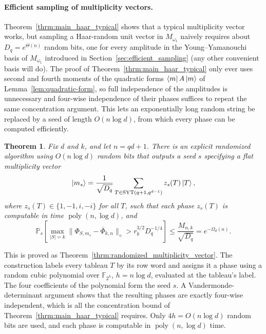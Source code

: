\documentclass[10pt,twocolumn,superscriptaddress,aps,amsmath,amssymb,citeautoscript,floatfix,prx]{revtex4-2}
\newcounter{alg}
\newtheorem{theorem}{Theorem}
\theoremstyle{plain}
\theoremstyle{plain}
\theoremstyle{plain}
\theoremstyle{plain}
\theoremstyle{plain}
\theoremstyle{plain}
\theoremstyle{plain}
\theoremstyle{definition}
\theoremstyle{plain}
\begin{document}
\paragraph{Efficient sampling of multiplicity vectors.}

Theorem~\ref{thrm:main_haar_typical} shows that a typical multiplicity vector works, but sampling a Haar-random unit vector in $M_{\omega_1}$ naively requires about $D_q=e^{\Theta(n)}$ random bits, 
one for every amplitude in the Young--Yamanouchi basis of $M_{\omega_1}$ introduced in Section~\ref{sec:efficient_sampling} (any other convenient basis will do). 
The proof of Theorem~\ref{thrm:main_haar_typical} only ever uses second and fourth moments of the quadratic forms $\bra mA\ket m$ of Lemma~\ref{lem:quadratic-form}, 
so full independence of the amplitudes is unnecessary and four-wise independence of their phases suffices to repeat the same concentration argument. 
This lets an exponentially long random string be replaced by a seed of length $O(n\log d)$, from which every phase can be computed efficiently.

\begin{theorem}\label{thrm:main_efficient_sampling}
Fix $d$ and $k$, and let $n=qd+1$. There is an explicit randomized algorithm using $O(n\log d)$ random bits that outputs a seed $s$ specifying a flat multiplicity vector
$$
\ket{m_s}
=
\frac1{\sqrt{D_q}}
\sum_{T\in\operatorname{SYT}(q+1,q^{d-1})}
z_s(T)\ket T,
$$
where $z_s(T)\in\{1,-1,i,-i\}$ for all $T$, such that each phase $z_s(T)$ is computable in time $\operatorname{poly}(n,\log d)$, and
$$
\mathbb P_s\left[
\max_{|S|=k}
\|\Phi_{S,m_s}-\overline\Phi_{k,n}\|_\diamond
>r_k^{3/2}D_q^{-1/4}
\right]
\le
\frac{M_{n,k}}{\sqrt{D_q}}
=
e^{-\Omega_d(n)}.
$$
\end{theorem}

This is proved as Theorem~\ref{thrm:randomized_multiplicity_vector}. The construction labels every tableau $T$ by its row word and assigns it a phase using a random cubic polynomial over $\mathbb F_{2^h}$, $h=n\log d$, evaluated at the tableau's label.
The four coefficients of the polynomial form the seed $s$. A Vandermonde-determinant argument shows that the resulting phases are exactly four-wise independent, which is all the concentration bound of Theorem~\ref{thrm:main_haar_typical} requires. 
Only $4h=O(n\log d)$ random bits are used, and each phase is computable in $\operatorname{poly}(n,\log d)$ time.
\end{document}
